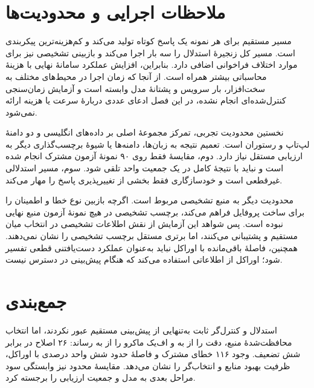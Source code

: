 \section{ملاحظات اجرایی و محدودیت‌ها}

مسیر مستقیم برای هر نمونه یک پاسخ کوتاه تولید می‌کند و کم‌هزینه‌ترین پیکربندی است. مسیر  کل زنجیرۀ استدلال را سه بار اجرا می‌کند و بازبینی تشخیصی نیز برای موارد اختلاف فراخوانی اضافی دارد. بنابراین، افزایش عملکرد سامانۀ نهایی با هزینۀ محاسباتی بیشتر همراه است. از آنجا که زمان اجرا در محیط‌های مختلف به سخت‌افزار، بار سرویس و پشتانۀ مدل وابسته است و آزمایش زمان‌سنجی کنترل‌شده‌ای انجام نشده، در این فصل ادعای عددی دربارۀ سرعت یا هزینه ارائه نمی‌شود.

نخستین محدودیت تجربی، تمرکز مجموعۀ اصلی بر داده‌های انگلیسی  و دو دامنۀ لپ‌تاپ و رستوران است. تعمیم نتیجه به زبان‌ها، دامنه‌ها یا شیوۀ برچسب‌گذاری دیگر به ارزیابی مستقل نیاز دارد. دوم، مقایسۀ  فقط روی ۹۰ نمونۀ آزمون مشترک انجام شده است و نباید با نتیجۀ کامل  در یک جمعیت واحد تلقی شود. سوم، مسیر استدلالی غیرقطعی است و خودسازگاری فقط بخشی از تغییرپذیری پاسخ را مهار می‌کند.

محدودیت دیگر به منبع تشخیصی مربوط است. اگرچه بازبین نوع خطا و اطمینان را برای ساخت پروفایل فراهم می‌کند، برچسب تشخیصی در هیچ نمونۀ آزمون منبع نهایی نبوده است. پس شواهد این آزمایش از نقش اطلاعات تشخیصی در انتخاب میان مستقیم و  پشتیبانی می‌کنند، اما برتری مستقل برچسب تشخیصی را نشان نمی‌دهند. همچنین، فاصلۀ باقی‌مانده با اوراکل نباید به‌عنوان عملکرد دست‌یافتنی قطعی تفسیر شود؛ اوراکل از اطلاعاتی استفاده می‌کند که هنگام پیش‌بینی در دسترس نیست.

\section{جمع‌بندی}

استدلال و کنترل‌گر ثابت به‌تنهایی از پیش‌بینی مستقیم عبور نکردند، اما انتخاب محافظت‌شدۀ منبع، دقت را از  به  و اف‌یک ماکرو را از  به  رساند: ۲۶ اصلاح در برابر شش تضعیف. وجود ۱۱۶ خطای مشترک و فاصلۀ حدود شش واحد درصدی با اوراکل، ظرفیت بهبود منابع و انتخاب‌گر را نشان می‌دهد. مقایسۀ محدود  نیز وابستگی سود مراحل بعدی به مدل و جمعیت ارزیابی را برجسته کرد.
